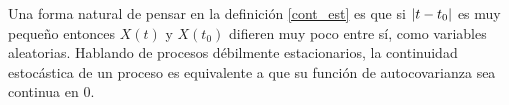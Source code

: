 Una forma natural de pensar en la definición \ref{cont_est} es que si $\left| t-t_0 \right|$ es muy pequeño 
entonces $X(t)$ y $X(t_0)$ difieren muy poco entre sí, como variables aleatorias.
%
Hablando de procesos débilmente estacionarios, la continuidad estocástica de un proceso es 
equivalente a que su función de autocovarianza sea continua en 0.

